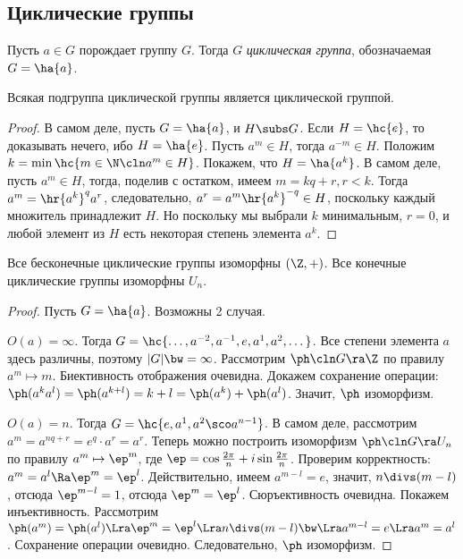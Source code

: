 \documentclass[a4paper]{article}
\begin{document}
\subsection{Циклические группы}

\begin{df}
Пусть $a \in G$ порождает группу $G$. Тогда $G$ \emph{циклическая группа}, обозначаемая $G = \ha{a}$.
\end{df}

\begin{theorem}
Всякая подгруппа циклической группы является циклической группой.
\end{theorem}
\begin{proof}
В самом деле, пусть $G= \ha{a}$, и $H \subs G$. Если $H=\hc{e}$, то доказывать нечего, ибо
$H=\ha{e}$. Пусть $a^m \in H$, тогда $a^{-m} \in H$. Положим $k=\min \hc{m \in \N\cln a^m \in H}$.
Покажем, что $H = \ha{a^k}$. В самом деле, пусть $a^m \in H$, тогда, поделив с остатком, имеем
$m = kq+r, r < k$. Тогда $a^m= \hr{a^k}^q a^r$, следовательно, $a^r=a^m \hr{a^k}^{-q} \in H$,
поскольку каждый множитель принадлежит $H$. Но поскольку мы выбрали $k$ минимальным, $r=0$, и
любой элемент из $H$ есть некоторая степень элемента $a^k$.
\end{proof}

\begin{theorem}
Все бесконечные циклические группы изоморфны $(\Z, +)$. Все конечные циклические группы изоморфны $U_n$.
\end{theorem}
\begin{proof}
Пусть $G = \ha{a}$. Возможны 2 случая.

 $O(a)=\infty$. Тогда $G = \hc{\dots, a^{-2}, a^{-1}, e, a^1, a^2, \dots}$. Все степени
элемента $a$ здесь различны, поэтому $|G| \bw= \infty$. Рассмотрим $\ph\cln G \ra \Z$ по правилу
$a^m \mapsto m$. Биективность отображения очевидна. Докажем сохранение операции:
$\ph(a^ka^l)=\ph(a^{k+l})=k+l = \ph(a^k) + \ph(a^l)$. Значит, $\ph$ изоморфизм.

 $O(a)=n$. Тогда $G = \hc{e, a^1, a^2\sco a^{n-1}}$. В самом деле, рассмотрим
$a^m=a^{nq+r}=e^q \cdot a^r = a^r$. Теперь можно построить изоморфизм $\ph\cln G \ra U_n$ по
правилу $a^m \mapsto \ep^m$, где $\ep = \cos\frac{2\pi}{n} + i \sin\frac{2\pi}{n}$. Проверим
корректность: $a^m=a^l \Ra \ep^m=\ep^l$. Действительно, имеем $a^{m-l}=e$, значит, $n \divs (m-l)$,
отсюда $\ep^{m-l}=1$, отсюда $\ep^m=\ep^l$.
Сюръективность очевидна. Покажем инъективность. Рассмотрим
$\ph(a^m)=\ph(a^l) \Lra \ep^m=\ep^l \Lra n \divs (m-l) \bw\Lra a^{m-l}=e \Lra a^m=a^l$.
Сохранение операции очевидно. Следовательно, $\ph$ изоморфизм.
\end{proof}
\end{document}
